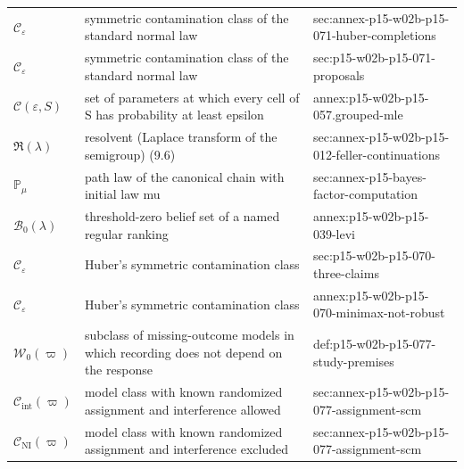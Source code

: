 \begin{longtable}{@{}p{}p{}p{}@{}}
\(\mathcal C_\varepsilon\) & symmetric contamination class of the standard normal law & sec:\allowbreak{}annex-\allowbreak{}p15-\allowbreak{}w02b-\allowbreak{}p15-\allowbreak{}071-\allowbreak{}huber-\allowbreak{}completions \\
\(\mathcal C_\varepsilon\) & symmetric contamination class of the standard normal law & sec:\allowbreak{}p15-\allowbreak{}w02b-\allowbreak{}p15-\allowbreak{}071-\allowbreak{}proposals \\
\(\mathcal C(\varepsilon,\allowbreak S)\) & set of parameters at which every cell of S has probability at least epsilon & annex:\allowbreak{}p15-\allowbreak{}w02b-\allowbreak{}p15-\allowbreak{}057.\allowbreak{}grouped-\allowbreak{}mle \\
\(\mathfrak R(\lambda)\) & resolvent (Laplace transform of the semigroup) (9.6) & sec:\allowbreak{}annex-\allowbreak{}p15-\allowbreak{}w02b-\allowbreak{}p15-\allowbreak{}012-\allowbreak{}feller-\allowbreak{}continuations \\
\(\mathbb P_\mu\) & path law of the canonical chain with initial law mu & sec:\allowbreak{}annex-\allowbreak{}p15-\allowbreak{}bayes-\allowbreak{}factor-\allowbreak{}computation \\
\(\mathcal B_0(\lambda)\) & threshold-zero belief set of a named regular ranking & annex:\allowbreak{}p15-\allowbreak{}w02b-\allowbreak{}p15-\allowbreak{}039-\allowbreak{}levi \\
\(\mathcal C_\varepsilon\) & Huber's symmetric contamination class & sec:\allowbreak{}p15-\allowbreak{}w02b-\allowbreak{}p15-\allowbreak{}070-\allowbreak{}three-\allowbreak{}claims \\
\(\mathcal C_\varepsilon\) & Huber's symmetric contamination class & annex:\allowbreak{}p15-\allowbreak{}w02b-\allowbreak{}p15-\allowbreak{}070-\allowbreak{}minimax-\allowbreak{}not-\allowbreak{}robust \\
\(\mathcal W_0(\varpi)\) & subclass of missing-outcome models in which recording does not depend on the response & def:\allowbreak{}p15-\allowbreak{}w02b-\allowbreak{}p15-\allowbreak{}077-\allowbreak{}study-\allowbreak{}premises \\
\(\mathcal C_{\mathrm{int}}(\varpi)\) & model class with known randomized assignment and interference allowed & sec:\allowbreak{}annex-\allowbreak{}p15-\allowbreak{}w02b-\allowbreak{}p15-\allowbreak{}077-\allowbreak{}assignment-\allowbreak{}scm \\
\(\mathcal C_{\mathrm{NI}}(\varpi)\) & model class with known randomized assignment and interference excluded & sec:\allowbreak{}annex-\allowbreak{}p15-\allowbreak{}w02b-\allowbreak{}p15-\allowbreak{}077-\allowbreak{}assignment-\allowbreak{}scm \\

\end{longtable}
